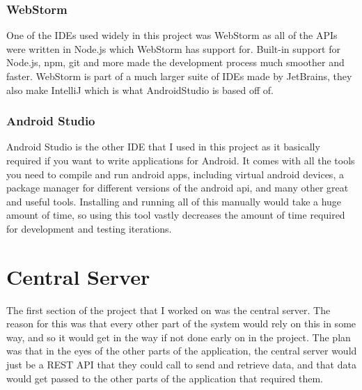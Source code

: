 \subsubsection*{WebStorm}
One of the IDEs used widely in this project was WebStorm as all of the APIs were written in Node.js which WebStorm has support for. Built-in support for Node.js, npm, git and more made the development process much smoother and faster. WebStorm is part of a much larger suite of IDEs made by JetBrains, they also make IntelliJ which is what AndroidStudio is based off of.

\subsubsection*{Android Studio}
Android Studio is the other IDE that I used in this project as it basically required if you want to write applications for Android. It comes with all the tools you need to compile and run android apps, including virtual android devices, a package manager for different versions of the android api, and many other great and useful tools. Installing and running all of this manually would take a huge amount of time, so using this tool vastly decreases the amount of time required for development and testing iterations.

\section{Central Server}
The first section of the project that I worked on was the central server. The reason for this was that every other part of the system would rely on this in some way, and so it would get in the way if not done early on in the project. The plan was that in the eyes of the other parts of the application, the central server would just be a REST API that they could call to send and retrieve data, and that data would get passed to the other parts of the application that required them.


